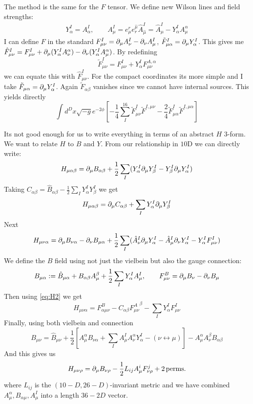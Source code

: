 \documentclass[11pt, class=article, crop=false]{standalone}
\begin{document}
\begin{enumerate}
	The method is the same for the $F$ tensor. We define new Wilson lines and field strengths:
	\[
	\begin{aligned}
		Y^I_\alpha = A^I_\alpha, \qquad A^I_\mu = e_\mu^r e^{\hat \mu}_r \hat A^I_{\hat \mu} = \hat A_\mu^I - Y^I_\alpha A^\alpha_\mu
	\end{aligned}
	\]
	I can define $F$ in the standard $F_{\mu \nu}^I = \partial_\mu A_\nu^I - \partial_\nu A_\mu^I$, $\tilde F_{\mu \alpha}^I = \partial_\mu Y_\alpha^I$. This gives me
	$\hat F_{\mu \nu}^I = F_{\mu \nu}^I + \partial_\mu (Y_\alpha^I A_\nu^\alpha) - \partial_\nu (Y_\alpha^I A_\mu^\alpha)$. By redefining 
	\[
		\tilde F^I_{\mu \nu} = F^I_{\mu \nu} + Y^I_\alpha F^{A, \alpha}_{\mu \nu}
	\]
	we can equate this with $\hat F_{\mu \nu}^I$. For the compact coordinates its more simple and I take $\tilde F_{\mu \alpha} = \partial_\mu Y^I_\alpha$. Again $\tilde F_{\alpha \beta}$ vanishes since we cannot have internal sources. This yields directly
	\[
		\int d^D x \sqrt{-g} e^{-2\phi}[-\frac14 \sum_I^{16} \tilde F^{I}_{\mu \nu} \tilde F^{I, \mu \nu} - \frac{2}{4} \tilde F^{I}_{\mu \alpha} \tilde F^{I, \mu \alpha}]
	\]
	
	Its not good enough for us to write everything in terms of an abstract $H$ 3-form. We want to relate $H$ to $B$ and $Y$. From our relationship in $10$D we can directly write:
	\[
	H_{\mu \alpha \beta} = \partial_\mu B_{\alpha \beta} + \frac12 \sum_{I} (Y^I_\alpha \partial_\mu Y^I_\beta - Y^I_\beta \partial_\mu Y^I_\alpha)
	\]
	Taking $C_{\alpha \beta} = \hat B_{\alpha \beta} - \frac12 \sum_I Y^I_\alpha Y^I_\beta$ we get
	\[
		H_{\mu \alpha \beta} = \partial_\mu C_{\alpha \beta} + \sum_I Y^I_\alpha \partial_\mu Y^I_\beta
	\]
	Next
	\[
		H_{\mu \nu \alpha} = \partial_\mu B_{\nu \alpha} - \partial_\nu B_{\mu \alpha} + \frac12 \sum_I (\hat A_\nu^I \partial_\mu Y^I_\alpha - \hat A^I_\mu \partial_\nu Y^I_\alpha - Y^I_\alpha F^I_{\mu \nu})
	\]
	We define the $B$ field using not just the vielbein but also the gauge connection:
	\[
		B_{\mu \alpha} := \hat B_{\mu \alpha} + B_{\alpha \beta} A^\beta_\mu + \frac12 \sum_I Y^I_\alpha A^I_\mu, \qquad F^B_{\mu \nu} = \partial_\mu B_\nu - \partial_\nu B_\mu
	\]
	Then using \eqref{eq:H2} we get
	\[
		H_{\mu \nu \alpha} = F^B_{\alpha \mu \nu} - C_{\alpha \beta} {F^{A}_{\mu \nu}}^\beta - \sum_I Y^I_\alpha F^I_{\mu \nu}
	\]
	Finally, using both vielbein and connection
	\[
		B_{\mu \nu} = \hat B_{\mu \nu} + \frac12 [A_\mu^\alpha B_{\nu \alpha} + \sum_{I} A_\mu^I A^\alpha_\nu Y^I_\alpha - (\nu \leftrightarrow \mu)] - A_\mu^\alpha A_\nu^\beta B_{\alpha \beta}
	\]
	And this gives us 
	\[
		H_{\mu \nu \rho} = \partial_\mu B_{\nu \rho} - \frac12 L_{ij} A^i_\mu F^j_{\nu \rho} + 2 \,\mathrm{perms.}
	\]
	where $L_{ij}$ is the $(10-D, 26 - D)$-invariant metric and we have combined $A^\alpha_\mu, B_{\alpha \mu}, A^I_\mu$ into a length $36-2D$ vector.
	

\end{enumerate}
\end{document}
